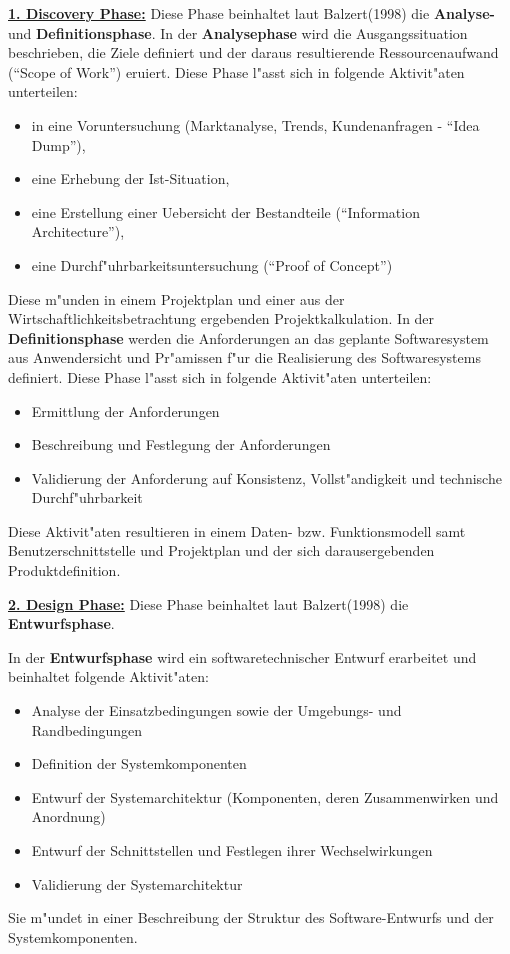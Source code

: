 \underline{\textbf{1. Discovery Phase:}}
\smallbreak
Diese Phase beinhaltet laut Balzert(1998)\supercite{Balzert1998} die \textbf{Analyse-} und \textbf{Definitionsphase}.
In der \textbf{Analysephase} wird die Ausgangssituation beschrieben,
die Ziele definiert und der daraus resultierende Ressourcenaufwand (\enquote{Scope of Work}) eruiert.\smallbreak
Diese Phase l"asst sich in folgende Aktivit"aten unterteilen:
\begin{itemize}
\item in eine Voruntersuchung (Marktanalyse, Trends, Kundenanfragen - \enquote{Idea Dump}),
\item eine Erhebung der Ist-Situation,
\item eine Erstellung einer Uebersicht der Bestandteile (\enquote{Information Architecture}),
\item eine Durchf"uhrbarkeitsuntersuchung (\enquote{Proof of Concept})
\end{itemize}
Diese m"unden in einem Projektplan und einer aus der Wirtschaftlichkeitsbetrachtung ergebenden Projektkalkulation.
\smallbreak
In der \textbf{Definitionsphase} werden die Anforderungen an das geplante Softwaresystem aus Anwendersicht und Pr"amissen f"ur die Realisierung des Softwaresystems definiert.\smallbreak
Diese Phase l"asst sich in folgende Aktivit"aten unterteilen:
\begin{itemize}
\item Ermittlung der Anforderungen
\item Beschreibung und Festlegung der Anforderungen
\item Validierung der Anforderung auf Konsistenz, Vollst"andigkeit und technische Durchf"uhrbarkeit
\end{itemize}

Diese Aktivit"aten resultieren in einem Daten- bzw. Funktionsmodell samt Benutzerschnittstelle und Projektplan und der sich darausergebenden Produktdefinition.

\bigbreak
\underline{\textbf{2. Design Phase:}}
\smallbreak
Diese Phase beinhaltet laut Balzert(1998)\supercite{Balzert1998} die \textbf{Entwurfsphase}.

In der \textbf{Entwurfsphase} wird ein softwaretechnischer Entwurf erarbeitet und beinhaltet folgende Aktivit"aten:
\begin{itemize}
  \item Analyse der Einsatzbedingungen sowie der Umgebungs- und Randbedingungen
  \item Definition der Systemkomponenten
  \item Entwurf der Systemarchitektur (Komponenten, deren Zusammenwirken und Anordnung)
  \item Entwurf der Schnittstellen und Festlegen ihrer Wechselwirkungen
  \item Validierung der Systemarchitektur
\end{itemize}
Sie m"undet in einer Beschreibung der Struktur des Software-Entwurfs und der Systemkomponenten.

